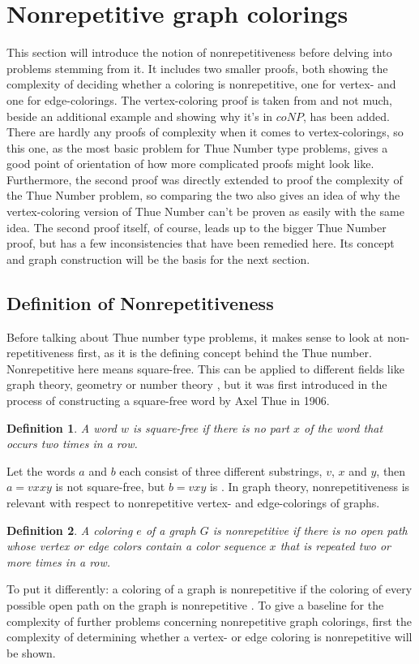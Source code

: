 \documentclass[12pt,a4paper]{article}
\newtheorem{definition}{Definition}
\begin{document}
\section{Nonrepetitive graph colorings}
This section will introduce the notion of nonrepetitiveness before delving into problems stemming from it. It includes two smaller proofs, both showing the complexity of deciding whether a coloring is nonrepetitive, one for vertex- and one for edge-colorings. The vertex-coloring proof is taken from \citep{Marx2009} and not much, beside an additional example and showing why it's in $coNP$, has been added. There are hardly any proofs of complexity when it comes to vertex-colorings, so this one, as the most basic problem for Thue Number type problems, gives a good point of orientation of how more complicated proofs might look like. Furthermore, the second proof \citep{Manin2008} was directly extended to proof the complexity of the Thue Number problem, so comparing the two also gives an idea of why the vertex-coloring version of Thue Number can't be proven as easily with the same idea. The second proof itself, of course, leads up to the bigger Thue Number proof, but has a few inconsistencies that have been remedied here. Its concept and graph construction will be the basis for the next section.

\subsection{Definition of Nonrepetitiveness}
Before talking about Thue number type problems, it makes sense to look at non-repetitiveness first, as it is the defining concept behind the  Thue number. Nonrepetitive here means square-free. This can be applied to different fields like graph theory, geometry or number theory \citep{Grytczuk2008}, but it was first introduced in the process of constructing a square-free word by Axel Thue in 1906. 
\begin{definition} 
A word $w$ is square-free if there is no part $x$ of the word that occurs two times in a row.
\end{definition} 
Let the words $a$ and $b$ each consist of three different substrings, $v$, $x$ and $y$, then $a = vxxy$ is not square-free, but $b = vxy$ is \citep{Thue1906}.
\newline
In graph theory, nonrepetitiveness is relevant with respect to nonrepetitive vertex- \citep{Marx2009} and edge-colorings of graphs. 
\begin{definition} 
A coloring $e$ of a graph $G$ is nonrepetitive if there is no open path whose vertex or edge colors contain a color sequence $x$ that is repeated two or more times in a row.
\end{definition} 
To put it differently: a coloring of a graph is nonrepetitive if the coloring of every possible open path on the graph is nonrepetitive \citep{Alon2002}. To give a baseline for the complexity of further problems concerning nonrepetitive graph colorings, first the complexity of determining whether a vertex- or edge coloring is nonrepetitive will be shown.
\end{document}
